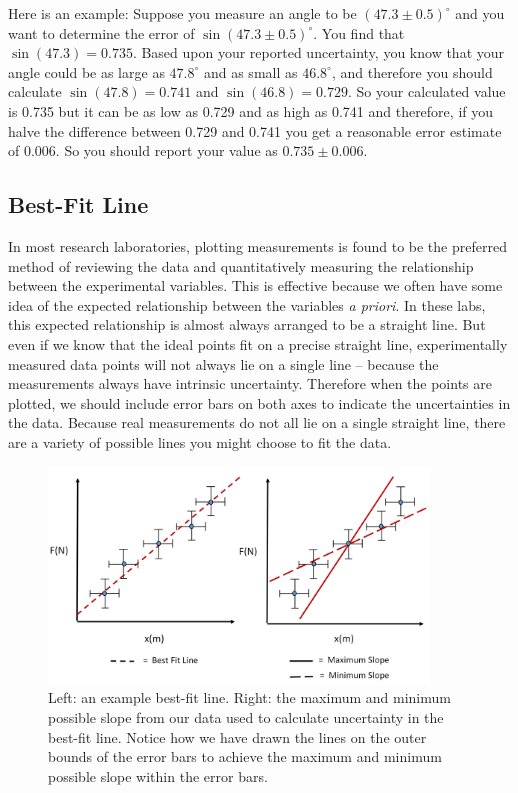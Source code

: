 Here is an example: Suppose you measure an angle to be $(47.3 \pm 0.5)^\circ$ and you want to determine the error of $\sin(47.3 \pm 0.5)^\circ$. You find that $\sin(47.3) = 0.735$. Based upon your reported uncertainty, you know that your angle could be as large as $47.8^\circ$ and as small as $46.8^\circ$, and therefore you should calculate $\sin(47.8) = 0.741$ and $\sin(46.8) = 0.729$. So your calculated value is 0.735 but it can be as low as 0.729 and as high as 0.741 and therefore, if you halve the difference between 0.729 and 0.741 you get a reasonable error estimate of 0.006. So you should report your value as $0.735 \pm 0.006$.

\subsection{Best-Fit Line}

In most research laboratories, plotting measurements is found to be the preferred method of reviewing the data and quantitatively measuring the relationship between the experimental variables. This is effective because we often have some idea of the expected relationship between the variables {\it{a priori}}. In these labs, this expected relationship is almost always arranged to be a straight line. But even if we know that the ideal points fit on a precise straight line, experimentally measured data points will not always lie on a single line -- because the measurements always have intrinsic uncertainty. Therefore when the points are plotted, we should include error bars on both axes to indicate the uncertainties in the data. Because real measurements do not all lie on a single straight line, there are a variety of possible lines you might choose to fit the data. \myskip

\begin{figure}[h]
    \begin{center}
        \includegraphics[width=0.9\textwidth, height=0.5\textwidth]{./Exp1-1/pic/image13.jpg}
    \end{center}
    \caption{Left: an example best-fit line. Right: the maximum and minimum possible slope from our data used to calculate uncertainty in the best-fit line. Notice how we have drawn the lines on the outer bounds of the error bars to achieve the maximum and minimum possible slope within the error bars.}
    \label{fig:bestfit}
\end{figure}

